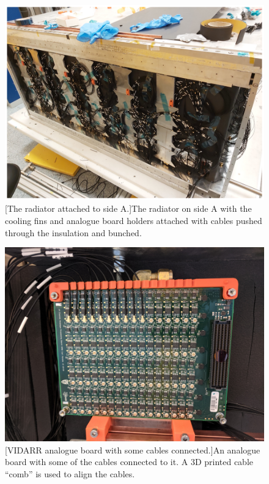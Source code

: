 \begin{figure}[!h]
\centering
\begin{minipage}{.45\textwidth}
  \centering
  \includegraphics[width=\linewidth]{Chapter3/Figs/Raster/detCon030b_RadiatorWithFins.png}
  [The radiator attached to side A.]{The radiator on side A with the cooling fins and analogue board holders attached with cables pushed through the insulation and bunched.} 
  \label{fig:detCon030b_RadiatorWithFins}
\end{minipage}%
\qquad
\begin{minipage}{.45\textwidth}
  \centering
  \includegraphics[width=\linewidth]{Chapter3/Figs/Raster/detCon032_ConnectedBoard.png} 
  [VIDARR analogue board with some cables connected.]{An analogue board with some of the cables connected to it. A 3D printed cable ``comb'' is used to align the cables.}
  \label{fig:detCon032_ConnectedBoard}
  \vspace{0.478cm} %
\end{minipage}
\end{figure}

